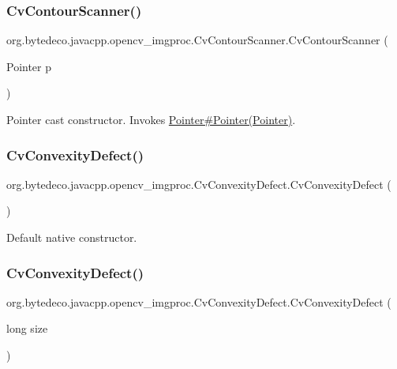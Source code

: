 \subsubsection{\texorpdfstring{Cv\+Contour\+Scanner()}{CvContourScanner()}\hspace{0.1cm}{\footnotesize\ttfamily [2/2]}}
{\footnotesize\ttfamily org.\+bytedeco.\+javacpp.\+opencv\+\_\+imgproc.\+Cv\+Contour\+Scanner.\+Cv\+Contour\+Scanner (\begin{DoxyParamCaption}\item[{Pointer}]{p }\end{DoxyParamCaption})\hspace{0.3cm}{\ttfamily [inline]}}

Pointer cast constructor. Invokes \hyperlink{}{Pointer\#\+Pointer(\+Pointer)}. \mbox{\label{group__imgproc_ga5c579571d2c7ce238f166ac14d106dc0}} 
\subsubsection{\texorpdfstring{Cv\+Convexity\+Defect()}{CvConvexityDefect()}\hspace{0.1cm}{\footnotesize\ttfamily [1/3]}}
{\footnotesize\ttfamily org.\+bytedeco.\+javacpp.\+opencv\+\_\+imgproc.\+Cv\+Convexity\+Defect.\+Cv\+Convexity\+Defect (\begin{DoxyParamCaption}{ }\end{DoxyParamCaption})\hspace{0.3cm}{\ttfamily [inline]}}

Default native constructor. \mbox{\label{group__imgproc_ga1bab8a5b2d8b0d218e13be2962c89bcf}} 
\subsubsection{\texorpdfstring{Cv\+Convexity\+Defect()}{CvConvexityDefect()}\hspace{0.1cm}{\footnotesize\ttfamily [2/3]}}
{\footnotesize\ttfamily org.\+bytedeco.\+javacpp.\+opencv\+\_\+imgproc.\+Cv\+Convexity\+Defect.\+Cv\+Convexity\+Defect (\begin{DoxyParamCaption}\item[{long}]{size }\end{DoxyParamCaption})\hspace{0.3cm}{\ttfamily [inline]}}

